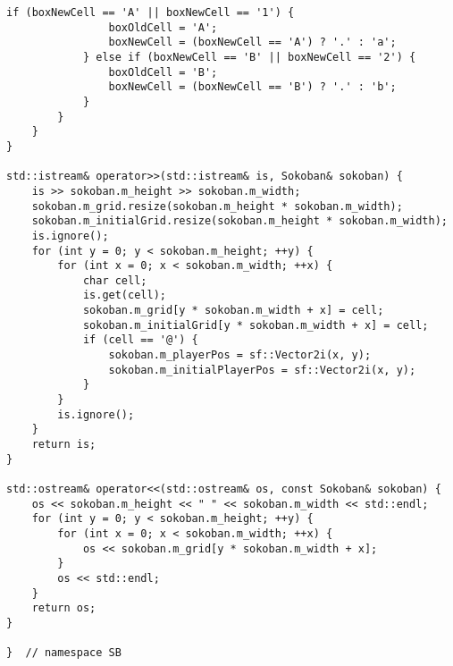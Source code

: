 \documentclass[12pt]{article}
\begin{document}
\begin{lstlisting}[style=cppcode]
            if (boxNewCell == 'A' || boxNewCell == '1') {
                boxOldCell = 'A';
                boxNewCell = (boxNewCell == 'A') ? '.' : 'a';
            } else if (boxNewCell == 'B' || boxNewCell == '2') {
                boxOldCell = 'B';
                boxNewCell = (boxNewCell == 'B') ? '.' : 'b';
            }
        }
    }
}

std::istream& operator>>(std::istream& is, Sokoban& sokoban) {
    is >> sokoban.m_height >> sokoban.m_width;
    sokoban.m_grid.resize(sokoban.m_height * sokoban.m_width);
    sokoban.m_initialGrid.resize(sokoban.m_height * sokoban.m_width);
    is.ignore();
    for (int y = 0; y < sokoban.m_height; ++y) {
        for (int x = 0; x < sokoban.m_width; ++x) {
            char cell;
            is.get(cell);
            sokoban.m_grid[y * sokoban.m_width + x] = cell;
            sokoban.m_initialGrid[y * sokoban.m_width + x] = cell;
            if (cell == '@') {
                sokoban.m_playerPos = sf::Vector2i(x, y);
                sokoban.m_initialPlayerPos = sf::Vector2i(x, y);
            }
        }
        is.ignore();
    }
    return is;
}

std::ostream& operator<<(std::ostream& os, const Sokoban& sokoban) {
    os << sokoban.m_height << " " << sokoban.m_width << std::endl;
    for (int y = 0; y < sokoban.m_height; ++y) {
        for (int x = 0; x < sokoban.m_width; ++x) {
            os << sokoban.m_grid[y * sokoban.m_width + x];
        }
        os << std::endl;
    }
    return os;
}

}  // namespace SB

\end{lstlisting}
\end{document}
